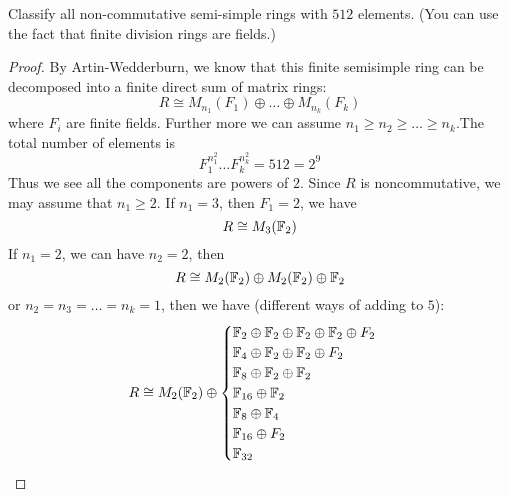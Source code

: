 \begin{prob}[S2010-Q5]
    Classify all non-commutative semi-simple rings with $512$ elements.
(You can use the fact that finite division rings are fields.)
\end{prob}
\begin{proof}
    By Artin-Wedderburn, we know that this finite semisimple ring can be decomposed into a finite direct sum of matrix rings:
    \begin{equation*}
        R\cong M_{n_1}(F_1)\oplus\dots\oplus M_{n_k}(F_k)
    \end{equation*}
    where $F_i$ are finite fields. Further more we can assume $n_1\geq n_2\geq\dots\geq n_k$.The total number of elements is 
    \begin{equation*}
        F_1^{n_1^2}\dots F_k^{n_k^2}=512=2^9
    \end{equation*}
    Thus we see all the components are powers of $2$. Since $R$ is noncommutative, we may assume that $n_1\geq 2$. If $n_1=3$, then $F_1=2$, we have 
    \begin{equation*}
        R\cong M_{3}(\mathbb{F}_2)
    \end{equation*}
    If $n_1=2$, we can have $n_2=2$, then 
    \begin{equation*}
        R\cong M_2(\mathbb{F}_2)\oplus M_2(\mathbb{F}_2)\oplus \mathbb{F}_2
    \end{equation*}
    or $n_2=n_3=\dots=n_k=1$, then we have (different ways of adding to $5$):
    \begin{equation*}
        R\cong M_2(\mathbb{F}_2)\oplus\begin{cases}
            \mathbb{F}_2\oplus\mathbb{F}_2\oplus\mathbb{F}_2\oplus\mathbb{F}_2\oplus F_2\\
            \mathbb{F}_{4}\oplus \mathbb{F}_2\oplus\mathbb{F}_2\oplus F_2\\
            \mathbb{F}_8\oplus\mathbb{F}_2\oplus\mathbb{F}_2\\
            \mathbb{F}_{16}\oplus\mathbb{F}_2\\
            \mathbb{F}_8\oplus\mathbb{F}_4\\
            \mathbb{F}_{16}\oplus F_2\\
            \mathbb{F}_{32}
        \end{cases}
    \end{equation*}



    
\end{proof}


